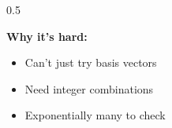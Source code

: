 \documentclass[aspectratio=169,10pt]{beamer}
\newcommand{\teaching}[1]{}
\theoremstyle{plain}
\begin{document}
\begin{frame}
\begin{columns}[T]
\begin{column}{0.5\textwidth}
    \vspace{0.3cm}
    
    \textbf{Why it's hard:}
    \begin{itemize}
      \item Can't just try basis vectors
      \item Need integer combinations
      \item Exponentially many to check
    \end{itemize}
  
    \end{column}
  \end{columns}
  
  \teaching{Define the core computational problem}
\end{frame}

\end{document}
